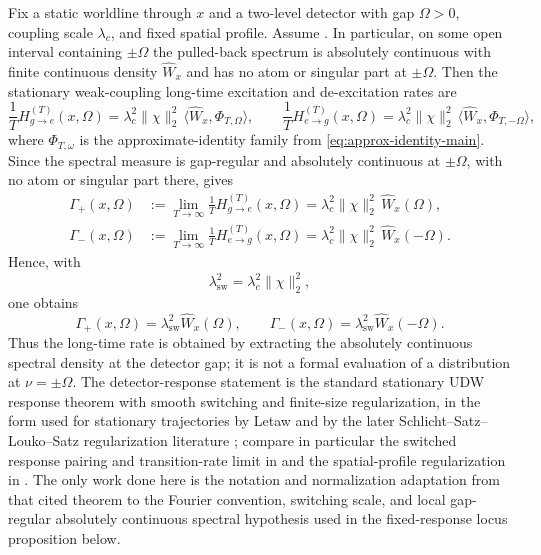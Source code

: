 \begin{importedinput}\label{prop:stationary-udw-response-main}
Fix a static worldline through $x$ and a two-level detector with gap $\Omega>0$, coupling scale $\lambda_c$, and fixed spatial profile. Assume . In particular, on some open interval containing $\pm\Omega$ the pulled-back spectrum is absolutely continuous with finite continuous density $\widehat W_x$ and has no atom or singular part at $\pm\Omega$. Then the stationary weak-coupling long-time excitation and de-excitation rates are
\begin{equation}\label{eq:long-time-kernel-main}
\frac{1}{T}H_{g\to e}^{(T)}(x,\Omega)
=\lambda_c^2\|\chi\|_2^2\,\langle \widehat W_x,\Phi_{T,\Omega}\rangle,
\qquad
\frac{1}{T}H_{e\to g}^{(T)}(x,\Omega)
=\lambda_c^2\|\chi\|_2^2\,\langle \widehat W_x,\Phi_{T,-\Omega}\rangle,
\end{equation}
where $\Phi_{T,\omega}$ is the approximate-identity family from
\eqref{eq:approx-identity-main}. Since the spectral measure is gap-regular and
absolutely continuous at $\pm\Omega$, with no atom or singular part there,
 gives
\begin{equation}\label{eq:long-time-limit-main}
\begin{aligned}
\Gamma_+(x,\Omega)
&:=\lim_{T\to\infty}\frac{1}{T}H_{g\to e}^{(T)}(x,\Omega)
=\lambda_c^2\|\chi\|_2^2\,\widehat W_x(\Omega),\\
\Gamma_-(x,\Omega)
&:=\lim_{T\to\infty}\frac{1}{T}H_{e\to g}^{(T)}(x,\Omega)
=\lambda_c^2\|\chi\|_2^2\,\widehat W_x(-\Omega).
\end{aligned}
\end{equation}
Hence, with
\[
\lambda_{\mathrm{sw}}^2=\lambda_c^2\|\chi\|_2^2,
\]
one obtains
\begin{equation}\label{eq:fourier-rates-main}
\Gamma_+(x,\Omega)=\lambda_{\mathrm{sw}}^2\widehat W_x(\Omega),
\qquad
\Gamma_-(x,\Omega)=\lambda_{\mathrm{sw}}^2\widehat W_x(-\Omega).
\end{equation}
Thus the long-time rate is obtained by extracting the absolutely continuous
spectral density at the detector gap; it is not a formal evaluation of a
distribution at $\nu=\pm\Omega$.
The detector-response statement is the standard stationary UDW response theorem
with smooth switching and finite-size regularization, in the form used for
stationary trajectories by Letaw and by the later Schlicht--Satz--Louko--Satz
regularization literature \cite{Letaw1981,Schlicht2004,Satz2007,LoukoSatz2006,LoukoSatz2008,FewsterJuarezLouko2016}; compare in particular the switched response
pairing and transition-rate limit in \cite[Sec.~II]{LoukoSatz2008} and the
spatial-profile regularization in \cite[Sec.~III]{LoukoSatz2006}.
The only work done here is the notation and normalization adaptation from that
cited theorem to the Fourier convention, switching scale, and local
gap-regular absolutely continuous spectral hypothesis used in the fixed-response
locus proposition below.
\end{importedinput}

